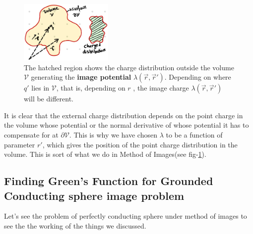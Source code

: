 \documentclass{article}
\begin{document}
\begin{figure}[H]
\centering
\includegraphics[width=0.4\textwidth]{Images/bound_dia_green1.jpeg}
\caption{The hatched region shows the charge distribution outside the volume $\mathcal{V}$ generating the \textbf{image potential} $\lambda(\vec{r},\vec{r}')$. Depending on where $q'$ lies in $\mathcal{V}$, that is, depending on $r$ , the image charge $\lambda(\vec{r},\vec{r}')$ will be different.}
\label{bound_dia_green1}
\end{figure}
It is clear that the external charge distribution depends on the point charge in the volume whose potential or the normal derivative of whose potential it has to compensate for at $\partial \mathcal{V}$. This is why we have chosen $\lambda$ to be a function of parameter $r'$, which gives the position of the point charge distribution in the volume. This is sort of what we do in Method of Images(see fig-\ref{bound_dia_green1}).
\subsection{Finding Green's Function for Grounded Conducting sphere image problem}
Let's see the problem of perfectly conducting sphere under method of images to see the the working of the things we discussed.
\end{document}

